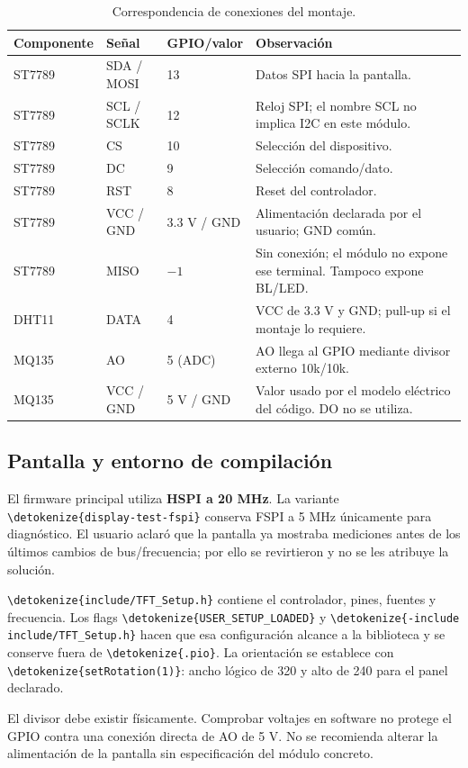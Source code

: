 \documentclass[11pt,a4paper]{article}
\newcommand{\code}[1]{\expandafter\nolinkurl\expandafter{\detokenize{#1}}}
\begin{document}
\begin{table}[h!]
\small
\begin{tabularx}{\linewidth}{@{}P{26mm}P{25mm}P{21mm}Y@{}}
\toprule
\textbf{Componente} & \textbf{Señal} & \textbf{GPIO/valor} & \textbf{Observación}\\\midrule
ST7789 & SDA / MOSI & 13 & Datos SPI hacia la pantalla.\\
ST7789 & SCL / SCLK & 12 & Reloj SPI; el nombre SCL no implica I2C en este módulo.\\
ST7789 & CS & 10 & Selección del dispositivo.\\
ST7789 & DC & 9 & Selección comando/dato.\\
ST7789 & RST & 8 & Reset del controlador.\\
ST7789 & VCC / GND & 3.3 V / GND & Alimentación declarada por el usuario; GND común.\\
ST7789 & MISO & $-1$ & Sin conexión; el módulo no expone ese terminal. Tampoco expone BL/LED.\\
DHT11 & DATA & 4 & VCC de 3.3 V y GND; pull-up si el montaje lo requiere.\\
MQ135 & AO & 5 (ADC) & AO llega al GPIO mediante divisor externo 10k/10k.\\
MQ135 & VCC / GND & 5 V / GND & Valor usado por el modelo eléctrico del código. DO no se utiliza.\\
\bottomrule
\end{tabularx}
\caption{Correspondencia de conexiones del montaje.}
\end{table}

\subsection{Pantalla y entorno de compilación}
El firmware principal utiliza \textbf{HSPI a 20 MHz}. La variante \code{display-test-fspi} conserva FSPI a 5 MHz únicamente para diagnóstico. El usuario aclaró que la pantalla ya mostraba mediciones antes de los últimos cambios de bus/frecuencia; por ello se revirtieron y no se les atribuye la solución.

\code{include/TFT_Setup.h} contiene el controlador, pines, fuentes y frecuencia. Los flags \code{USER_SETUP_LOADED} y \code{-include include/TFT_Setup.h} hacen que esa configuración alcance a la biblioteca y se conserve fuera de \code{.pio}. La orientación se establece con \code{setRotation(1)}: ancho lógico de 320 y alto de 240 para el panel declarado.

El divisor debe existir físicamente. Comprobar voltajes en software no protege el GPIO contra una conexión directa de AO de 5 V. No se recomienda alterar la alimentación de la pantalla sin especificación del módulo concreto.
\end{document}
